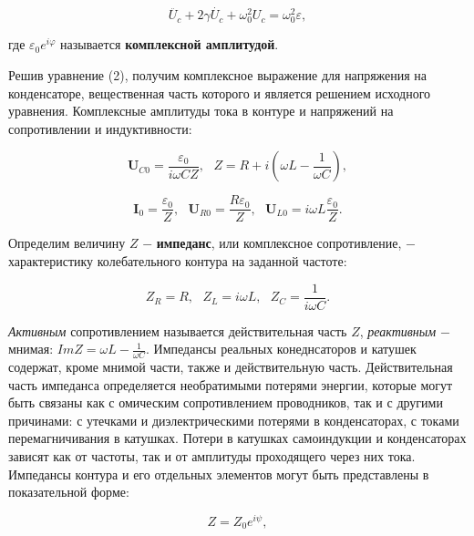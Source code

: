 \documentclass[a4paper,12pt]{article} %
\begin{document}
\begin{equation}\label{ linkname }
\ddot{U_{c}} + 2\gamma \dot{U_{c}} + \omega_{0}^2U_{c} = \omega_{0}^2\varepsilon,
\end{equation}

\hfill \break где $\varepsilon_{0}e^{i\varphi}$ называется \textbf{комплексной амплитудой}. 

\hfill \break Решив уравнение (2), получим комплексное выражение для напряжения на конденсаторе, вещественная часть которого и является решением исходного уравнения. Комплексные амплитуды тока в контуре и напряжений на сопротивлении и индуктивности:

\begin{equation}\label{ linkname }
\textbf{U}_{C0} = \frac{\varepsilon_{0}}{i\omega CZ}, \text{       } Z = R + i(\omega L - \frac{1}{\omega C}),
\end{equation}

\begin{equation}\label{ linkname }
\textbf{I}_{0} = \frac{\varepsilon_{0}}{Z}, \text{                 } \textbf{U}_{R0} = \frac{R\varepsilon_{0}}{Z}, \text{                    } \textbf{U}_{L0} = i\omega L\frac{\varepsilon_{0}}{Z}.
\end{equation}

\hfill \break Определим величину $Z$ $-$ \textbf{импеданс}, или комплексное сопротивление, $-$ характеристику колебательного контура на заданной частоте:

$$
Z_{R} = R, \text{ } Z_{L} = i\omega L, \text{ } Z_{C} =  \frac{1}{i\omega C}.
$$

\hfill \break \textit{Активным} сопротивлением называется действительная часть $Z$, \textit{реактивным} $-$ мнимая: $Im Z = \omega L - \frac{1}{\omega C}$. Импедансы реальных конеднсаторов и катушек содержат, кроме мнимой части, также и действительную часть. Действительная часть импеданса определяется необратимыми потерями энергии, которые могут быть связаны как с омическим сопротивлением проводников, так и с другими причинами: с утечками и диэлектрическими потерями в конденсаторах, с токами перемагничивания в катушках. Потери в катушках самоиндукции и конденсаторах зависят как от частоты, так и от амплитуды проходящего через них тока. Импедансы контура и его отдельных элементов могут быть представлены в показательной форме:

\begin{equation}\label{ linkname }
Z = Z_{0}e^{i\psi},
\end{equation}
\end{document}
